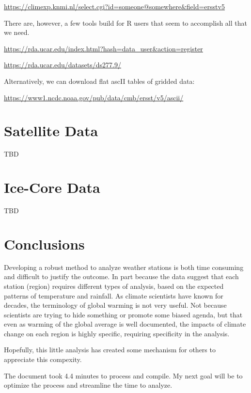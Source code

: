 \documentclass{article}\usepackage[]{graphicx}\usepackage[]{color}
\makeatletter
\newenvironment{kframe}{%
 \def\at@end@of@kframe{}%
 \ifinner\ifhmode%
  \def\at@end@of@kframe{\end{minipage}}%
  \begin{minipage}{\columnwidth}%
 \fi\fi%
 \def\FrameCommand##1{\hskip\@totalleftmargin \hskip-\fboxsep
 \colorbox{shadecolor}{##1}\hskip-\fboxsep
     \hskip-\linewidth \hskip-\@totalleftmargin \hskip\columnwidth}%
 \MakeFramed {\advance\hsize-\width
   \@totalleftmargin\z@ \linewidth\hsize
   \@setminipage}}%
 {\par\unskip\endMakeFramed%
 \at@end@of@kframe}
\newenvironment{knitrout}{}{} %
\makeatother
\begin{document}
\url{https://climexp.knmi.nl/select.cgi?id=someone@somewhere&field=ersstv5}

There are, however, a few tools build for R users that seem to accomplish all that we need. 

\url{https://rda.ucar.edu/index.html?hash=data_user&action=register}

\url{https://rda.ucar.edu/datasets/ds277.9/}

Alternatively, we can download flat ascII tables of gridded data:

\url{https://www1.ncdc.noaa.gov/pub/data/cmb/ersst/v5/ascii/}




\section{Satellite Data}

TBD

\section{Ice-Core Data}

TBD

\section{Conclusions}

Developing a robust method to analyze weather stations is both time consuming and difficult to justify the outcome. In part because the data suggest that each station (region) requires different types of analysis, based on the expected patterns of temperature and rainfall. As climate scientists have known for decades, the terminology of global warming is not very useful. Not because scientists are trying to hide something or promote some biased agenda, but that even as warming of the global average is well documented, the impacts of climate change on each region is highly specific, requiring specificity in the analysis. 

Hopefully, this little analysis has created some mechanism for others to appreciate this compexity. 
\begin{knitrout}
\color{fgcolor}\begin{kframe}


{\ttfamily\noindent\bfseries\color{errorcolor}{\#\# Error in data.frame(State = fips\$State, Station = stid, gif\_public = gif\_public, : object 'png\_public' not found}}

{\ttfamily\noindent\bfseries\color{errorcolor}{\#\# Error in is.data.frame(x): object 'dbase' not found}}\end{kframe}
\end{knitrout}

The document took 4.4 minutes to process and compile. My next goal will be to optimize the process and streamline the time to analyze. 
\end{document}
